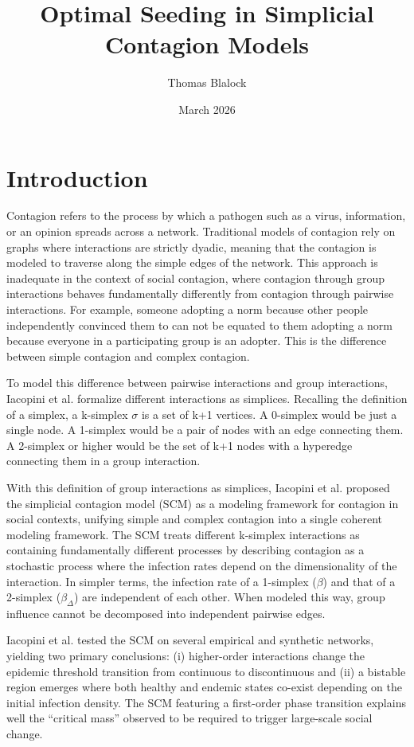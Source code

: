 \documentclass[12pt]{article}
\title{Optimal Seeding in Simplicial Contagion Models}
\author{Thomas Blalock}
\date{March 2026}
\begin{document}
\maketitle

\section{Introduction}
Contagion refers to the process by which a pathogen such as a virus, information, or an opinion spreads across a network. Traditional models of contagion rely on graphs where interactions are strictly dyadic, meaning that the contagion is modeled to traverse along the simple edges of the network. This approach is inadequate in the context of social contagion, where contagion through group interactions behaves fundamentally differently from contagion through pairwise interactions. For example, someone adopting a norm because other people independently convinced them to can not be equated to them adopting a norm because everyone in a participating group is an adopter. This is the difference between simple contagion and complex contagion.

To model this difference between pairwise interactions and group interactions, Iacopini et al. \cite{iacopini2019} formalize different interactions as simplices. Recalling the definition of a simplex, a k-simplex $\sigma$ is a set of k+1 vertices. A 0-simplex would be just a single node. A 1-simplex would be a pair of nodes with an edge connecting them. A 2-simplex or higher would be the set of k+1 nodes with a hyperedge connecting them in a group interaction. 

With this definition of group interactions as simplices, Iacopini et al. \cite{iacopini2019} proposed the simplicial contagion model (SCM) as a modeling framework for contagion in social contexts, unifying simple and complex contagion into a single coherent modeling framework. The SCM treats different k-simplex interactions as containing fundamentally different processes by describing contagion as a stochastic process where the infection rates depend on the dimensionality of the interaction. In simpler terms, the infection rate of a 1-simplex ($\beta$) and that of a 2-simplex ($\beta_{\Delta}$) are independent of each other. When modeled this way, group influence cannot be decomposed into independent pairwise edges.

Iacopini et al. \cite{iacopini2019} tested the SCM on several empirical and synthetic networks, yielding two primary conclusions: (i) higher-order interactions change the epidemic threshold transition from continuous to discontinuous and (ii) a bistable region emerges where both healthy and endemic states co-exist depending on the initial infection density. The SCM featuring a first-order phase transition explains well the “critical mass” observed to be required to trigger large-scale social change.
\end{document}
